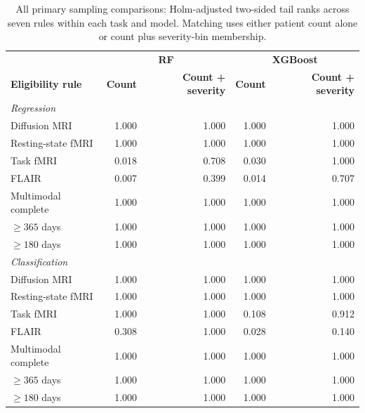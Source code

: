 \begin{table}[!t]
\caption{All primary sampling comparisons: Holm-adjusted two-sided tail ranks across seven rules within each task and model. Matching uses either patient count alone or count plus severity-bin membership.}
\label{tab:matched-complete}
\centering\footnotesize
\begin{tabular}{lrrrr}
\toprule
 & \multicolumn{2}{c}{\textbf{RF}} & \multicolumn{2}{c}{\textbf{XGBoost}} \\
\textbf{Eligibility rule} & \textbf{Count} & \textbf{Count + severity} & \textbf{Count} & \textbf{Count + severity} \\
\midrule
\multicolumn{5}{l}{\emph{Regression}} \\
Diffusion MRI & 1.000 & 1.000 & 1.000 & 1.000 \\
Resting-state fMRI & 1.000 & 1.000 & 1.000 & 1.000 \\
Task fMRI & 0.018 & 0.708 & 0.030 & 1.000 \\
FLAIR & 0.007 & 0.399 & 0.014 & 0.707 \\
Multimodal complete & 1.000 & 1.000 & 1.000 & 1.000 \\
$\ge365$ days & 1.000 & 1.000 & 1.000 & 1.000 \\
$\ge180$ days & 1.000 & 1.000 & 1.000 & 1.000 \\
\midrule
\multicolumn{5}{l}{\emph{Classification}} \\
Diffusion MRI & 1.000 & 1.000 & 1.000 & 1.000 \\
Resting-state fMRI & 1.000 & 1.000 & 1.000 & 1.000 \\
Task fMRI & 1.000 & 1.000 & 0.108 & 0.912 \\
FLAIR & 0.308 & 1.000 & 0.028 & 0.140 \\
Multimodal complete & 1.000 & 1.000 & 1.000 & 1.000 \\
$\ge365$ days & 1.000 & 1.000 & 1.000 & 1.000 \\
$\ge180$ days & 1.000 & 1.000 & 1.000 & 1.000 \\
\bottomrule
\end{tabular}
\end{table}

